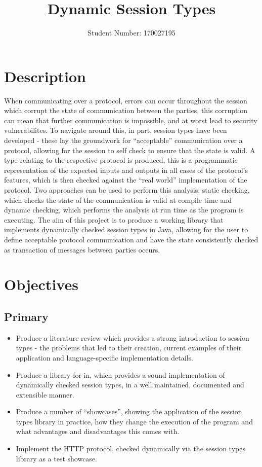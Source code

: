 \documentclass{article}
\author{Student Number: 170027195}
\title{Dynamic Session Types}
\begin{document}
\maketitle
\section{Description}
When communicating over a protocol, errors can occur throughout the session which corrupt the state of communication between the parties, this corruption can mean that further communication is impossible, and at worst lead to security vulnerabilites. To navigate around this, in part, session types have been developed - these lay the groundwork for “acceptable” communication over a protocol, allowing for the session to self check to ensure that the state is valid. A type relating to the respective protocol is produced, this is a programmatic representation of the expected inputs and outputs in all cases of the protocol’s features, which is then checked against the “real world” implementation of the protocol. Two approaches can be used to perform this analysis; static checking, which checks the state of the communication is valid at compile time and dynamic checking, which performs the analysis at run time as the program is executing. The aim of this project is to produce a working library that implements dynamically checked session types in Java, allowing for the user to define acceptable protocol communication and have the state consistently checked as transaction of messages between parties occurs.
\section{Objectives}
\subsection{Primary}
\begin{itemize}
	\item Produce a literature review which provides a strong introduction to session types - the problems that led to their creation, current examples of their application and language-specific implementation details.
	\item Produce a library for in, which provides a sound implementation of dynamically checked session types, in a well maintained, documented and extensible manner.
	\item Produce a number of “showcases”, showing the application of the session types library in practice, how they change the execution of the program and what advantages and disadvantages this comes with.
	\item Implement the HTTP protocol, checked dynamically via the session types library as a test showcase.
\end{itemize}
\end{document}
